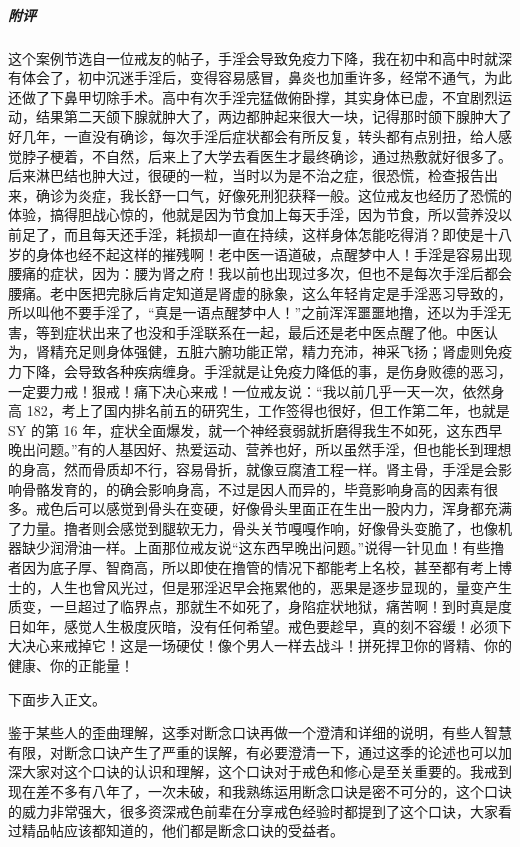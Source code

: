 \begin{case}
    \subparagraph{附评} 这个案例节选自一位戒友的帖子，手淫会导致免疫力下降，我在初中和高中时就深有体会了，初中沉迷手淫后，变得容易感冒，鼻炎也加重许多，经常不通气，为此还做了下鼻甲切除手术。高中有次手淫完猛做俯卧撑，其实身体已虚，不宜剧烈运动，结果第二天颌下腺就肿大了，两边都肿起来很大一块，记得那时颌下腺肿大了好几年，一直没有确诊，每次手淫后症状都会有所反复，转头都有点别扭，给人感觉脖子梗着，不自然，后来上了大学去看医生才最终确诊，通过热敷就好很多了。后来淋巴结也肿大过，很硬的一粒，当时以为是不治之症，很恐慌，检查报告出来，确诊为炎症，我长舒一口气，好像死刑犯获释一般。这位戒友也经历了恐慌的体验，搞得胆战心惊的，他就是因为节食加上每天手淫，因为节食，所以营养没以前足了，而且每天还手淫，耗损却一直在持续，这样身体怎能吃得消？即使是十八岁的身体也经不起这样的摧残啊！老中医一语道破，点醒梦中人！手淫是容易出现腰痛的症状，因为：腰为肾之府！我以前也出现过多次，但也不是每次手淫后都会腰痛。老中医把完脉后肯定知道是肾虚的脉象，这么年轻肯定是手淫恶习导致的，所以叫他不要手淫了，“真是一语点醒梦中人！”之前浑浑噩噩地撸，还以为手淫无害，等到症状出来了也没和手淫联系在一起，最后还是老中医点醒了他。中医认为，肾精充足则身体强健，五脏六腑功能正常，精力充沛，神采飞扬；肾虚则免疫力下降，会导致各种疾病缠身。手淫就是让免疫力降低的事，是伤身败德的恶习，一定要力戒！狠戒！痛下决心来戒！一位戒友说：“我以前几乎一天一次，依然身高 182，考上了国内排名前五的研究生，工作签得也很好，但工作第二年，也就是 SY 的第 16 年，症状全面爆发，就一个神经衰弱就折磨得我生不如死，这东西早晚出问题。”有的人基因好、热爱运动、营养也好，所以虽然手淫，但也能长到理想的身高，然而骨质却不行，容易骨折，就像豆腐渣工程一样。肾主骨，手淫是会影响骨骼发育的，的确会影响身高，不过是因人而异的，毕竟影响身高的因素有很多。戒色后可以感觉到骨头在变硬，好像骨头里面正在生出一股内力，浑身都充满了力量。撸者则会感觉到腿软无力，骨头关节嘎嘎作响，好像骨头变脆了，也像机器缺少润滑油一样。上面那位戒友说“这东西早晚出问题。”说得一针见血！有些撸者因为底子厚、智商高，所以即使在撸管的情况下都能考上名校，甚至都有考上博士的，人生也曾风光过，但是邪淫迟早会拖累他的，恶果是逐步显现的，量变产生质变，一旦超过了临界点，那就生不如死了，身陷症状地狱，痛苦啊！到时真是度日如年，感觉人生极度灰暗，没有任何希望。戒色要趁早，真的刻不容缓！必须下大决心来戒掉它！这是一场硬仗！像个男人一样去战斗！拼死捍卫你的肾精、你的健康、你的正能量！
\end{case}

下面步入正文。

鉴于某些人的歪曲理解，这季对断念口诀再做一个澄清和详细的说明，有些人智慧有限，对断念口诀产生了严重的误解，有必要澄清一下，通过这季的论述也可以加深大家对这个口诀的认识和理解，这个口诀对于戒色和修心是至关重要的。我戒到现在差不多有八年了，一次未破，和我熟练运用断念口诀是密不可分的，这个口诀的威力非常强大，很多资深戒色前辈在分享戒色经验时都提到了这个口诀，大家看过精品帖应该都知道的，他们都是断念口诀的受益者。

